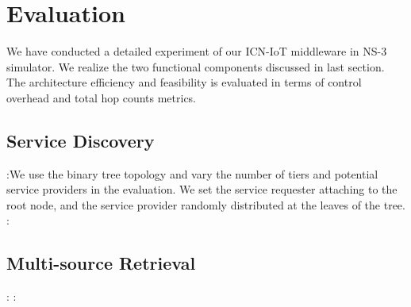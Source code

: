 \section{Evaluation}
We have conducted a detailed experiment of our ICN-IoT middleware in NS-3 simulator. We realize the two functional components discussed in last section. The architecture efficiency and feasibility is evaluated in terms of control overhead and total hop counts metrics.
\subsection{Service Discovery}
\vspace{1mm}:We use the binary tree topology and vary the number of tiers and potential service providers in the evaluation. We set the service requester attaching to the root node, and the service provider randomly distributed at the leaves of the tree. 
\vspace{1mm}: 

\subsection{Multi-source Retrieval}
\vspace{1mm}:
\vspace{1mm}:

